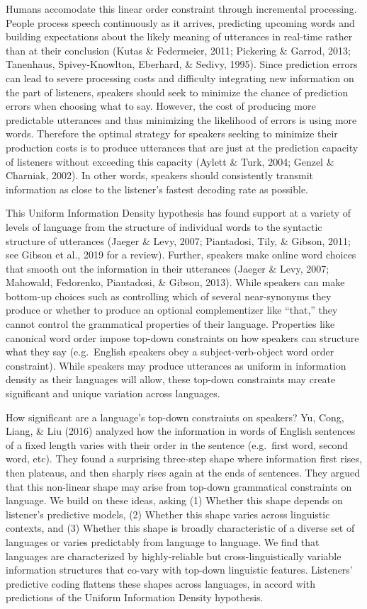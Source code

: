 \documentclass[10pt, letterpaper]{article}
\begin{document}
Humans accomodate this linear order constraint through incremental
processing. People process speech continuously as it arrives, predicting
upcoming words and building expectations about the likely meaning of
utterances in real-time rather than at their conclusion (Kutas \&
Federmeier, 2011; Pickering \& Garrod, 2013; Tanenhaus, Spivey-Knowlton,
Eberhard, \& Sedivy, 1995). Since prediction errors can lead to severe
processing costs and difficulty integrating new information on the part
of listeners, speakers should seek to minimize the chance of prediction
errors when choosing what to say. However, the cost of producing more
predictable utterances and thus minimizing the likelihood of errors is
using more words. Therefore the optimal strategy for speakers seeking to
minimize their production costs is to produce utterances that are just
at the prediction capacity of listeners without exceeding this capacity
(Aylett \& Turk, 2004; Genzel \& Charniak, 2002). In other words,
speakers should consistently transmit information as close to the
listener's fastest decoding rate as possible.

This Uniform Information Density hypothesis has found support at a
variety of levels of language from the structure of individual words to
the syntactic structure of utterances (Jaeger \& Levy, 2007; Piantadosi,
Tily, \& Gibson, 2011; see Gibson et al., 2019 for a review). Further,
speakers make online word choices that smooth out the information in
their utterances (Jaeger \& Levy, 2007; Mahowald, Fedorenko, Piantadosi,
\& Gibson, 2013). While speakers can make bottom-up choices such as
controlling which of several near-synonyms they produce or whether to
produce an optional complementizer like ``that,'' they cannot control
the grammatical properties of their language. Properties like canonical
word order impose top-down constraints on how speakers can structure
what they say (e.g.~English speakers obey a subject-verb-object word
order constraint). While speakers may produce utterances as uniform in
information density as their languages will allow, these top-down
constraints may create significant and unique variation across
languages.

How significant are a language's top-down constraints on speakers? Yu,
Cong, Liang, \& Liu (2016) analyzed how the information in words of
English sentences of a fixed length varies with their order in the
sentence (e.g.~first word, second word, etc). They found a surprising
three-step shape where information first rises, then plateaus, and then
sharply rises again at the ends of sentences. They argued that this
non-linear shape may arise from top-down grammatical constraints on
language. We build on these ideas, asking (1) Whether this shape depends
on listener's predictive models, (2) Whether this shape varies across
linguistic contexts, and (3) Whether this shape is broadly
characteristic of a diverse set of languages or varies predictably from
language to language. We find that languages are characterized by
highly-reliable but cross-linguistically variable information structures
that co-vary with top-down linguistic features. Listeners' predictive
coding flattens these shapes across languages, in accord with
predictions of the Uniform Information Density hypothesis.
\end{document}
